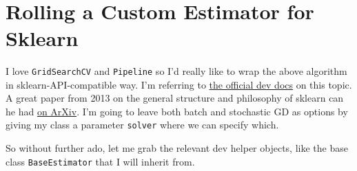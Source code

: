 \documentclass[11pt]{article}
\begin{document}
    \begin{center}
    \end{center}
    { \hspace*{\fill} \\}
    
    \section{Rolling a Custom Estimator for
Sklearn}\label{rolling-a-custom-estimator-for-sklearn}

I love \texttt{GridSearchCV} and \texttt{Pipeline} so I'd really like to
wrap the above algorithm in sklearn-API-compatible way. I'm referring to
\href{http://scikit-learn.org/stable/developers/contributing.html\#rolling-your-own-estimator}{the
official dev docs} on this topic. A great paper from 2013 on the general
structure and philosophy of sklearn can he had
\href{https://arxiv.org/pdf/1309.0238v1.pdf}{on ArXiv}. I'm going to
leave both batch and stochastic GD as options by giving my class a
parameter \texttt{solver} where we can specify which.

So without further ado, let me grab the relevant dev helper objects,
like the base class \texttt{BaseEstimator} that I will inherit from.
\end{document}
